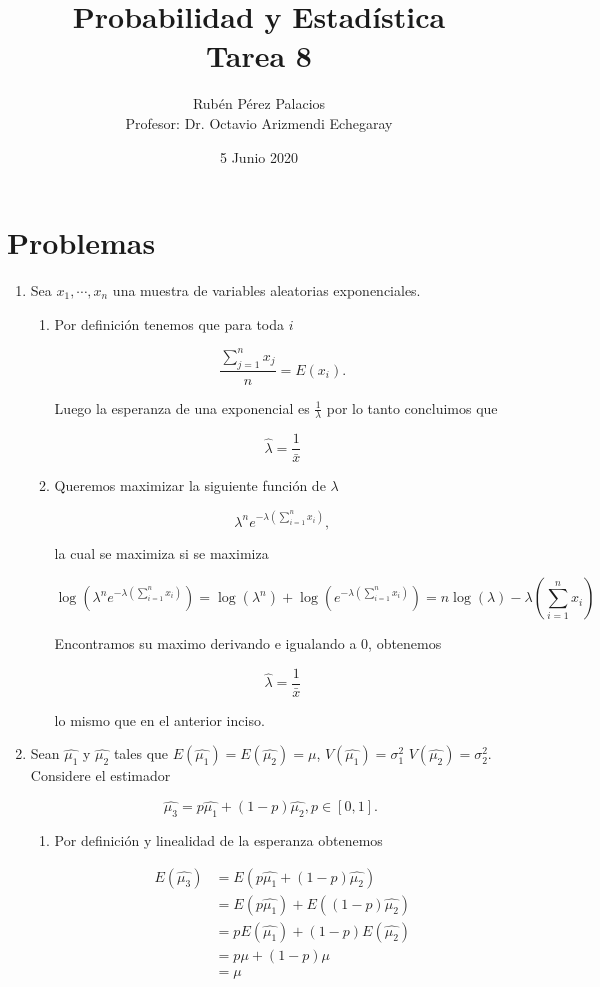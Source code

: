 \documentclass[letterpaper]{article}
\title{Probabilidad y Estadística\\Tarea 8}
\author{Rubén Pérez Palacios\\Profesor: Dr. Octavio Arizmendi Echegaray}
\date{5 Junio 2020}
\theoremstyle{definition}
\theoremstyle{lemathm}
\theoremstyle{lemademthm}
\begin{document}
	\maketitle
    
    \section*{Problemas}

    \begin{enumerate}
        \item Sea $x_1,\cdots, x_n$ una muestra de variables aleatorias exponenciales.
        \begin{enumerate}
			\item Por definición tenemos que para toda $i$
			
			\[\frac{\sum_{j=1}^n x_j}{n} = E(x_i).\]

			Luego la esperanza de una exponencial es $\frac{1}{\lambda}$ por lo tanto concluimos que

			\[\hat{\lambda} = \frac{1}{\bar{x}}\]

			\item Queremos maximizar la siguiente función de $\lambda$
			
			\[\lambda^{n}e^{-\lambda(\sum_{i=1}^n x_i)},\]

			la cual se maximiza si se maximiza

			\[\log(\lambda^{n}e^{-\lambda(\sum_{i=1}^n x_i)}) = \log(\lambda^{n}) + \log(e^{-\lambda(\sum_{i=1}^n x_i)}) = n\log(\lambda) -\lambda(\sum_{i=1}^n x_i)\]

			Encontramos su maximo derivando e igualando a 0, obtenemos

			\[\hat{\lambda} = \frac{1}{\bar{x}}\]

			lo mismo que en el anterior inciso.
		\end{enumerate}

		\item Sean $\hat{\mu_1}$ y $\hat{\mu_2}$ tales que $E(\hat{\mu_1}) = E(\hat{\mu_2}) = \mu$, $V(\hat{\mu_1}) = \sigma_1^2$ $V(\hat{\mu_2}) = \sigma_2^2$. Considere el estimador
		
		\[\hat{\mu_3} = p\hat{\mu_1} + (1-p)\hat{\mu_2}, p \in [0,1].\]

		\begin{enumerate}
			\item Por definición y linealidad de la esperanza obtenemos
			
			\begin{align*}
				E(\hat{\mu_3}) &= E(p\hat{\mu_1} + (1-p)\hat{\mu_2})\\
				&= E(p\hat{\mu_1}) + E((1-p)\hat{\mu_2})\\
				&= pE(\hat{\mu_1}) + (1-p)E(\hat{\mu_2})\\
				&= p\mu + (1-p)\mu\\
				&= \mu
			\end{align*}


\end{enumerate}
\end{enumerate}
\end{document}
